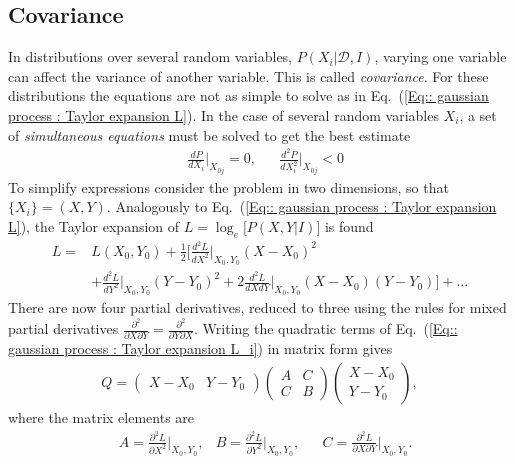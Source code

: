 \documentclass[twoside,english]{uiofysmaster}
\begin{document}
\subsection{Covariance}\label{Sec:: gaussian process : Covariance}

In distributions over several random variables, $P(X_i| \mathcal{D}, I)$, varying one variable can affect the variance of another variable. This is called \textit{covariance}. For these distributions the equations are not as simple to solve as in Eq.\ (\ref{Eq:: gaussian process : Taylor expansion L}). In the case of several random variables $X_i$, a set of \textit{simultaneous equations} must be solved to get the best estimate
\begin{align}\label{Eq:: gaussian process : Best estimate X_i}
&\frac{dP}{dX_i} \Big|_{X_{0j}} =0, &&\frac{d^2P}{dX_i^2} \Big|_{X_{0j}} < 0
\end{align}
To simplify expressions consider the problem in two dimensions, so that $\{ X_i \} = (X, Y)$. Analogously to Eq.~(\ref{Eq:: gaussian process : Taylor expansion L}), the Taylor expansion of $L = \log_e \Big[ P(X, Y |I) \Big]$ is found
\begin{align}\label{Eq:: gaussian process : Taylor expansion L_i}
L =& L(X_0, Y_0) + \frac{1}{2} \Big[ \frac{d^2L}{dX^2}  \Big|_{X_0, Y_0}(X-X_0)^2 \nonumber \\
& + \frac{d^2L}{dY^2}  \Big|_{X_0, Y_0}(Y-Y_0)^2 + 2 \frac{d^2L}{dXdY}  \Big|_{X_0, Y_0}(X-X_0)(Y-Y_0) \Big] +...
\end{align}
There are now four partial derivatives, reduced to three using the rules for mixed partial derivatives $\frac{\partial^2}{\partial X \partial Y} = \frac{\partial^2}{\partial Y \partial X}$. Writing the quadratic terms of Eq.~(\ref{Eq:: gaussian process : Taylor expansion L_i}) in matrix form gives
\begin{align}
Q = 
\begin{pmatrix}
X-X_0 & Y -Y_0
\end{pmatrix}
\begin{pmatrix}
A & C\\
C & B
\end{pmatrix}
\begin{pmatrix}
X -X_0\\
Y-Y_0
\end{pmatrix},
\end{align}
where the matrix elements are
\begin{align}\label{Eq:: gaussian process : covariance matrix ABC}
&A = \frac{\partial^2 L}{\partial X^2} \Big|_{X_0, Y_0}, &B = \frac{\partial^2 L}{\partial Y^2} \Big|_{X_0, Y_0}, &&C = \frac{\partial^2 L}{\partial X \partial Y} \Big|_{X_0, Y_0}.
\end{align}
\end{document}
